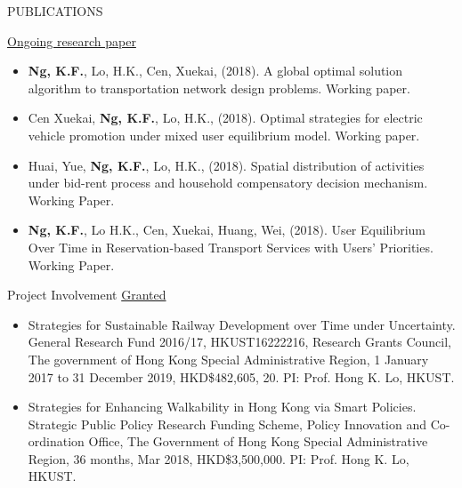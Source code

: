 \documentclass{resume} %
\begin{document}
\begin{rSection}{PUBLICATIONS}
\begin{enumerate}
\end{enumerate}
\underline{Ongoing research paper}
\begin{itemize}
\item \textbf{Ng, K.F.}, Lo, H.K., Cen, Xuekai, (2018). A global optimal solution
algorithm to transportation network design problems. Working paper.
\item Cen Xuekai, \textbf{Ng, K.F.}, Lo, H.K., (2018). Optimal strategies for electric
vehicle promotion under mixed user equilibrium model. Working paper.
\item Huai, Yue, \textbf{Ng, K.F.}, Lo, H.K., (2018). Spatial distribution of activities
under bid-rent process and household compensatory decision mechanism. Working Paper.
\item \textbf {Ng, K.F.}, Lo H.K., Cen, Xuekai, Huang, Wei, (2018). User Equilibrium
Over Time in Reservation-based Transport Services with Users’ Priorities. Working Paper.
\end{itemize}
\end{rSection}

\begin{rSection}{Project Involvement}
\smallskip \underline{Granted}
\begin{itemize}
\item Strategies for Sustainable Railway Development over Time under Uncertainty.
General Research Fund 2016/17, HKUST16222216, Research Grants Council, The government
of Hong Kong Special Administrative Region, 1 January 2017 to 31 December 2019,
HKD\$482,605, 20. PI: Prof. Hong K. Lo, HKUST.
\item Strategies for Enhancing Walkability in Hong Kong via Smart Policies. Strategic
Public Policy Research Funding Scheme, Policy Innovation and Co-ordination Office, The
Government of Hong Kong Special Administrative Region, 36 months, Mar 2018,
HKD\$3,500,000. PI: Prof. Hong K. Lo, HKUST.
\end{itemize}
\end{rSection}
\end{document}
